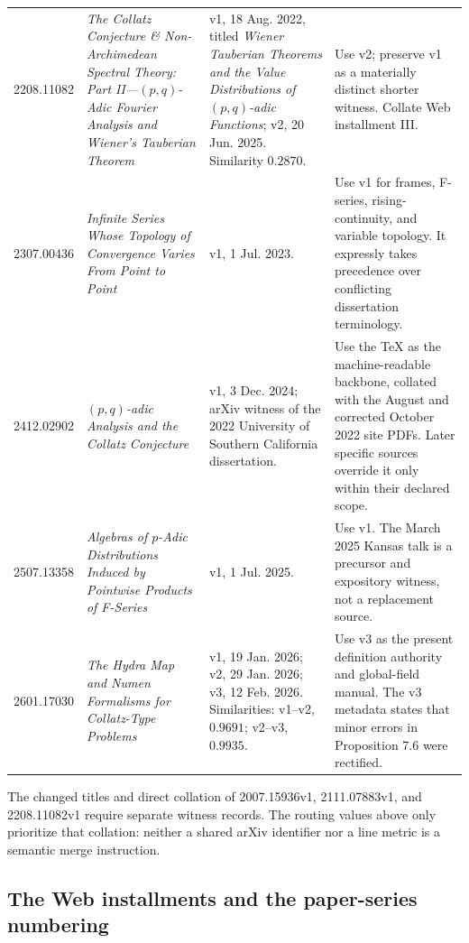\begin{longtable}{@{}p{}p{}p{}p{}@{}}
2208.11082 & \emph{The Collatz Conjecture \& Non-Archimedean Spectral Theory: Part II---$(p,q)$-Adic Fourier Analysis and Wiener's Tauberian Theorem}
& v1, 18 Aug. 2022, titled \emph{Wiener Tauberian Theorems and the Value Distributions of $(p,q)$-adic Functions}; v2, 20 Jun. 2025.  Similarity $0.2870$.
& Use v2; preserve v1 as a materially distinct shorter witness.  Collate Web installment III.\\

2307.00436 & \emph{Infinite Series Whose Topology of Convergence Varies From Point to Point}
& v1, 1 Jul. 2023.
& Use v1 for frames, F-series, rising-continuity, and variable topology.  It expressly takes precedence over conflicting dissertation terminology.\\

2412.02902 & \emph{$(p,q)$-adic Analysis and the Collatz Conjecture}
& v1, 3 Dec. 2024; arXiv witness of the 2022 University of Southern California dissertation.
& Use the TeX as the machine-readable backbone, collated with the August and corrected October 2022 site PDFs.  Later specific sources override it only within their declared scope.\\

2507.13358 & \emph{Algebras of $p$-Adic Distributions Induced by Pointwise Products of F-Series}
& v1, 1 Jul. 2025.
& Use v1.  The March 2025 Kansas talk is a precursor and expository witness, not a replacement source.\\

2601.17030 & \emph{The Hydra Map and Numen Formalisms for Collatz-Type Problems}
& v1, 19 Jan. 2026; v2, 29 Jan. 2026; v3, 12 Feb. 2026.  Similarities: v1--v2, $0.9691$; v2--v3, $0.9935$.
& Use v3 as the present definition authority and global-field manual.  The v3 metadata states that minor errors in Proposition 7.6 were rectified.\\
\bottomrule
\end{longtable}
\endgroup

The changed titles and direct collation of 2007.15936v1, 2111.07883v1, and
2208.11082v1 require separate witness records.  The routing values above only
prioritize that collation: neither a shared arXiv identifier nor a line metric
is a semantic merge instruction.

\subsection{The Web installments and the paper-series numbering}


